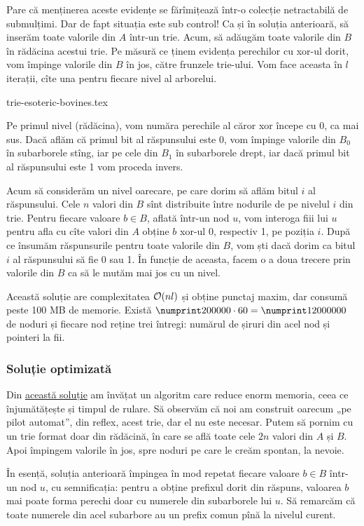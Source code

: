 \documentclass[../main.tex]{subfiles}
\begin{document}
Pare că menținerea aceste evidențe se fărîmițează într-o colecție netractabilă de submulțimi. Dar de fapt situația este sub control! Ca și în soluția anterioară, să inserăm toate valorile din $A$ într-un trie. Acum, să adăugăm toate valorile din $B$ în rădăcina acestui trie. Pe măsură ce ținem evidența perechilor cu xor-ul dorit, vom împinge valorile din $B$ în jos, către frunzele trie-ului. Vom face aceasta în $l$ iterații, cîte una pentru fiecare nivel al arborelui.

{trie-esoteric-bovines.tex}

Pe primul nivel (rădăcina), vom număra perechile al căror xor începe cu 0, ca mai sus. Dacă aflăm că primul bit al răspunsului este 0, vom împinge valorile din $B_0$ în subarborele stîng, iar pe cele din $B_1$ în subarborele drept, iar dacă primul bit al răspunsului este 1 vom proceda invers.

Acum să considerăm un nivel oarecare, pe care dorim să aflăm bitul $i$ al răspunsului. Cele $n$ valori din $B$ sînt distribuite între nodurile de pe nivelul $i$ din trie. Pentru fiecare valoare $b \in B$, aflată într-un nod $u$, vom interoga fiii lui $u$ pentru afla cu cîte valori din $A$ obține $b$ xor-ul 0, respectiv 1, pe poziția $i$. După ce însumăm răspunsurile pentru toate valorile din $B$, vom ști dacă dorim ca bitul $i$ al răspunsului să fie 0 sau 1. În funcție de aceasta, facem o a doua trecere prin valorile din $B$ ca să le mutăm mai jos cu un nivel.

Această soluție are complexitatea $\mathcal{O}(nl)$ și obține punctaj maxim, dar consumă peste 100 MB de memorie. Există $\np{200000} \cdot 60 = \np{12000000}$ de noduri și fiecare nod reține trei întregi: numărul de șiruri din acel nod și pointeri la fii.

\subsubsection*{Soluție optimizată}

Din \href{https://kilonova.ro/submissions/372990}{această soluție} am învățat un algoritm care reduce enorm memoria, ceea ce înjumătățește și timpul de rulare. Să observăm că noi am construit oarecum „pe pilot automat”, din reflex, acest trie, dar el nu este necesar. Putem să pornim cu un trie format doar din rădăcină, în care se află toate cele $2n$ valori din $A$ și $B$. Apoi împingem valorile în jos, spre noduri pe care le creăm spontan, la nevoie.

În esență, soluția anterioară împingea în mod repetat fiecare valoare $b \in B$ într-un nod $u$, cu semnificația: pentru a obține prefixul dorit din răspuns, valoarea $b$ mai poate forma perechi doar cu numerele din subarborele lui $u$. Să remarcăm că toate numerele din acel subarbore au un prefix comun pînă la nivelul curent.
\end{document}
